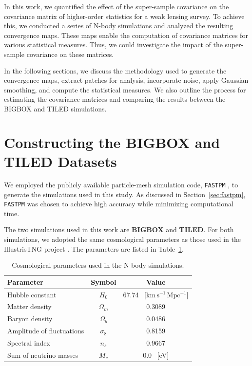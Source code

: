 
In this work, we quantified the effect of the super-sample covariance on the covariance matrix of higher-order statistics for a weak lensing survey. To achieve this, we conducted a series of N-body simulations and analyzed the resulting convergence maps. These maps enable the computation of covariance matrices for various statistical measures. Thus, we could investigate the impact of the super-sample covariance on these matrices.

In the following sections, we discuss the methodology used to generate the convergence maps, extract patches for analysis, incorporate noise, apply Gaussian smoothing, and compute the statistical measures. We also outline the process for estimating the covariance matrices and comparing the results between the BIGBOX and TILED simulations.

\section{Constructing the BIGBOX and TILED Datasets}
We employed the publicly available particle-mesh simulation code, \texttt{FASTPM} \citep{10.1093/mnras/stw2123}, to generate the simulations used in this study. As discussed in Section~\ref{sec:fastpm}, \texttt{FASTPM} was chosen to achieve high accuracy while minimizing computational time.

The two simulations used in this work are \textbf{BIGBOX} and \textbf{TILED}. For both simulations, we adopted the same cosmological parameters as those used in the IllustrisTNG project \citep{2019ComAC...6....2N}. The parameters are listed in Table~\ref{tab:simulations}.

\begin{table}[h]
    \centering
    \begin{tabular}{lcc}
    \toprule
    \textbf{Parameter} & \textbf{Symbol} & \textbf{Value} \\
    \midrule
    Hubble constant & $H_0$ & 67.74 \, [$\mathrm{km\,s^{-1}\,Mpc^{-1}}$] \\ 
    Matter density & $\Omega_m$ & 0.3089 \\
    Baryon density & $\Omega_b$ & 0.0486 \\
    Amplitude of fluctuations & $\sigma_8$ & 0.8159 \\
    Spectral index & $n_s$ & 0.9667 \\
    Sum of neutrino masses & $M_{\nu}$ & 0.0 \, [eV] \\
    \bottomrule
    \end{tabular}
    \caption{Cosmological parameters used in the N-body simulations.}\label{tab:simulations}
\end{table}


